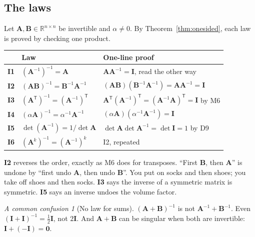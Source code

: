 \documentclass[11pt]{article}
\theoremstyle{plain}
\theoremstyle{definition}
\theoremstyle{remark}
\newtheorem*{warn}{A common confusion}
\newcommand{\R}{\mathbb{R}}
\newcommand{\mt}[1]{\mathbf{#1}}
\newcommand{\T}{^{\mathsf{T}}}
\begin{document}
\subsection{The laws}
Let $\mt{A},\mt{B}\in\R^{n\times n}$ be invertible and $\alpha\neq0$. By
Theorem~\ref{thm:onesided}, each law is proved by checking one product.
\begin{center}
\renewcommand{\arraystretch}{1.45}
\begin{tabular}{@{}l l l@{}}
\toprule
 & \textbf{Law} & \textbf{One-line proof} \\
\midrule
\textbf{I1} & $(\mt{A}^{-1})^{-1}=\mt{A}$ & $\mt{A}\mt{A}^{-1}=\mt{I}$, read the other way \\
\textbf{I2} & $(\mt{A}\mt{B})^{-1}=\mt{B}^{-1}\mt{A}^{-1}$ & $(\mt{A}\mt{B})(\mt{B}^{-1}\mt{A}^{-1})=\mt{A}\mt{A}^{-1}=\mt{I}$ \\
\textbf{I3} & $(\mt{A}\T)^{-1}=(\mt{A}^{-1})\T$ & $\mt{A}\T(\mt{A}^{-1})\T=(\mt{A}^{-1}\mt{A})\T=\mt{I}$ by M6 \\
\textbf{I4} & $(\alpha\mt{A})^{-1}=\alpha^{-1}\mt{A}^{-1}$ & $(\alpha\mt{A})(\alpha^{-1}\mt{A}^{-1})=\mt{I}$ \\
\textbf{I5} & $\det(\mt{A}^{-1})=1/\det\mt{A}$ & $\det\mt{A}\det\mt{A}^{-1}=\det\mt{I}=1$ by D9 \\
\textbf{I6} & $(\mt{A}^{k})^{-1}=(\mt{A}^{-1})^{k}$ & I2, repeated \\
\bottomrule
\end{tabular}
\end{center}

\noindent \textbf{I2} reverses the order, exactly as M6 does for transposes.
``First $\mt{B}$, then $\mt{A}$'' is undone by ``first undo $\mt{A}$, then undo
$\mt{B}$''. You put on socks and then shoes; you take off shoes and then socks.
\textbf{I3} says the inverse of a symmetric matrix is symmetric. \textbf{I5} says
an inverse undoes the volume factor.

\begin{warn}[No law for sums]
$(\mt{A}+\mt{B})^{-1}$ is not $\mt{A}^{-1}+\mt{B}^{-1}$. Even
$(\mt{I}+\mt{I})^{-1}=\frac12\mt{I}$, not $2\mt{I}$. And $\mt{A}+\mt{B}$ can be
singular when both are invertible: $\mt{I}+(-\mt{I})=\mt{0}$.
\end{warn}

\end{document}
